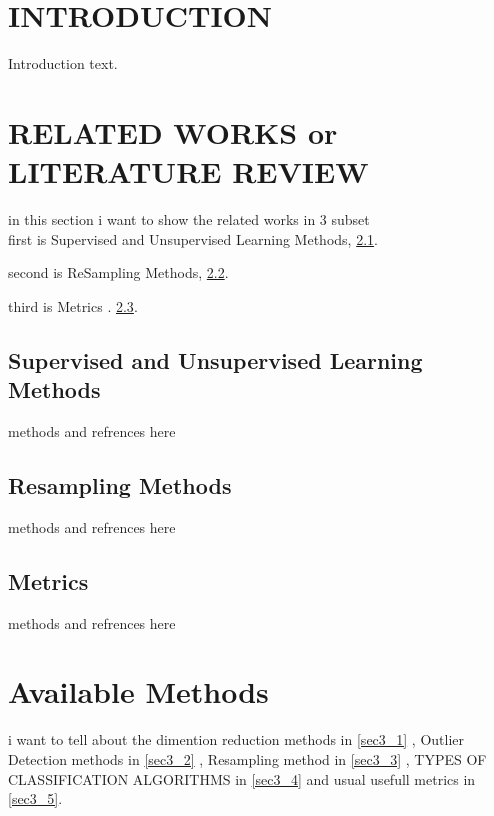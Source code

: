\documentclass[preprint,12pt]{elsarticle}
\begin{document}


\section{INTRODUCTION}
\label{sec1}

Introduction text.


\section{RELATED WORKS  or LITERATURE REVIEW}
\label{sec2}
in this section i want to show the related works in 3 subset\\
first is Supervised and Unsupervised Learning Methods, \ref{sec2_1}.

second is ReSampling Methods, \ref{sec2_2}.

third is Metrics .
\ref{sec2_3}.


\subsection{Supervised and Unsupervised Learning Methods}
\label{sec2_1}
methods and refrences here


\subsection{Resampling Methods}
\label{sec2_2}
methods and refrences here


\subsection{Metrics}
\label{sec2_3}
methods and refrences here


\section{Available Methods}
\label{sec3}
i want to tell about the dimention reduction methods in \ref{sec3_1} ,
Outlier Detection methods in \ref{sec3_2} , 
Resampling method in \ref{sec3_3} , 
TYPES OF CLASSIFICATION ALGORITHMS in \ref{sec3_4} 
and usual usefull metrics in \ref{sec3_5}.
\end{document}
